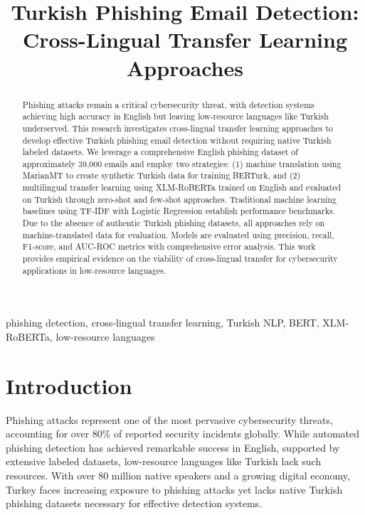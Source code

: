 \documentclass[conference]{IEEEtran}
\begin{document}
\title{Turkish Phishing Email Detection: Cross-Lingual Transfer Learning Approaches}

\author{
}

\maketitle

\begin{abstract}
Phishing attacks remain a critical cybersecurity threat, with detection systems achieving high accuracy in English but leaving low-resource languages like Turkish underserved. This research investigates cross-lingual transfer learning approaches to develop effective Turkish phishing email detection without requiring native Turkish labeled datasets. We leverage a comprehensive English phishing dataset of approximately 39,000 emails and employ two strategies: (1) machine translation using MarianMT to create synthetic Turkish data for training BERTurk, and (2) multilingual transfer learning using XLM-RoBERTa trained on English and evaluated on Turkish through zero-shot and few-shot approaches. Traditional machine learning baselines using TF-IDF with Logistic Regression establish performance benchmarks. Due to the absence of authentic Turkish phishing datasets, all approaches rely on machine-translated data for evaluation. Models are evaluated using precision, recall, F1-score, and AUC-ROC metrics with comprehensive error analysis. This work provides empirical evidence on the viability of cross-lingual transfer for cybersecurity applications in low-resource languages.
\end{abstract}

\begin{IEEEkeywords}
phishing detection, cross-lingual transfer learning, Turkish NLP, BERT, XLM-RoBERTa, low-resource languages
\end{IEEEkeywords}

\section{Introduction}

Phishing attacks represent one of the most pervasive cybersecurity threats, accounting for over 80\% of reported security incidents globally. While automated phishing detection has achieved remarkable success in English, supported by extensive labeled datasets, low-resource languages like Turkish lack such resources. With over 80 million native speakers and a growing digital economy, Turkey faces increasing exposure to phishing attacks yet lacks native Turkish phishing datasets necessary for effective detection systems.
\end{document}

